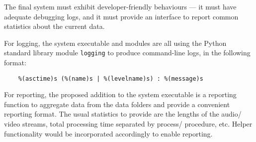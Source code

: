 The final system must exhibit developer-friendly behaviours --- it must have adequate debugging logs, and it must provide an interface to report common statistics about the current data.

For logging, the system executable and modules are all using the Python standard library module \texttt{logging} to produce command-line logs, in the following format:

\begin{lstlisting}
    %(asctime)s (%(name)s | %(levelname)s) : %(message)s
\end{lstlisting}

For reporting, the proposed addition to the system executable is a reporting function to aggregate data from the data folders and provide a convenient reporting format. The usual statistics to provide are the lengths of the audio/ video streams, total processing time separated by process/ procedure, etc. Helper functionality would be incorporated accordingly to enable reporting.